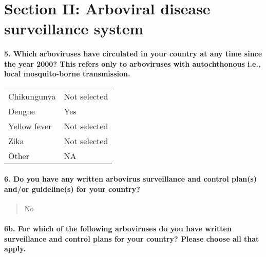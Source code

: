 \documentclass[
]{article}
\begin{document}
\hypertarget{section-ii-arboviral-disease-surveillance-system}{%
\section{Section II: Arboviral disease surveillance
system}\label{section-ii-arboviral-disease-surveillance-system}}

\hypertarget{which-arboviruses-have-circulated-in-your-country-at-any-time-since-the-year-2000-this-refers-only-to-arboviruses-with-autochthonous-i.e.-local-mosquito-borne-transmission.}{%
\paragraph{5. Which arboviruses have circulated in your country at any
time since the year 2000? This refers only to arboviruses with
autochthonous i.e., local mosquito-borne
transmission.}\label{which-arboviruses-have-circulated-in-your-country-at-any-time-since-the-year-2000-this-refers-only-to-arboviruses-with-autochthonous-i.e.-local-mosquito-borne-transmission.}}

\begin{longtable}[]{@{}ll@{}}
\toprule
\endhead
Chikungunya & Not selected \\
Dengue & Yes \\
Yellow fever & Not selected \\
Zika & Not selected \\
Other & NA \\
\bottomrule
\end{longtable}

\hypertarget{do-you-have-any-written-arbovirus-surveillance-and-control-plans-andor-guidelines-for-your-country}{%
\paragraph{6. Do you have any written arbovirus surveillance and control
plan(s) and/or guideline(s) for your
country?}\label{do-you-have-any-written-arbovirus-surveillance-and-control-plans-andor-guidelines-for-your-country}}

\begin{quote}
No
\end{quote}

\hypertarget{b.-for-which-of-the-following-arboviruses-do-you-have-written-surveillance-and-control-plans-for-your-country-please-choose-all-that-apply.}{%
\paragraph{6b. For which of the following arboviruses do you have
written surveillance and control plans for your country? Please choose
all that
apply.}\label{b.-for-which-of-the-following-arboviruses-do-you-have-written-surveillance-and-control-plans-for-your-country-please-choose-all-that-apply.}}
\end{document}
